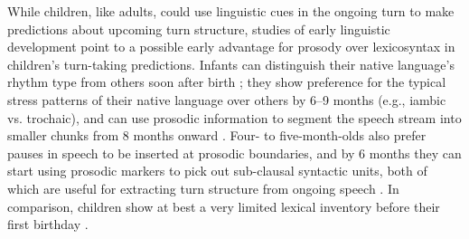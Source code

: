 \documentclass[authoryear, 12pt]{elsarticle}
\begin{document}
While children, like adults, could use linguistic cues in the ongoing turn to make predictions about upcoming turn structure, studies of early linguistic development point to a possible early advantage for prosody over lexicosyntax in children's turn-taking predictions. Infants can distinguish their native language's rhythm type from others soon after birth \citep{mehler1988, nazzi2003}; they show preference for the typical stress patterns of their native language over others by 6--9 months (e.g., iambic vs. trochaic), and can use prosodic information to segment the speech stream into smaller chunks from 8 months onward \citep{johnson2001, morgan1995}. Four- to five-month-olds also prefer pauses in speech to be inserted at prosodic boundaries, and by 6 months they can start using prosodic markers to pick out sub-clausal syntactic units, both of which are useful for extracting turn structure from ongoing speech \citep{jusczyk1995, soderstrom2003}. In comparison, children show at best a very limited lexical inventory before their first birthday \citep{bergelson2013, shi2010}.


\end{document}
